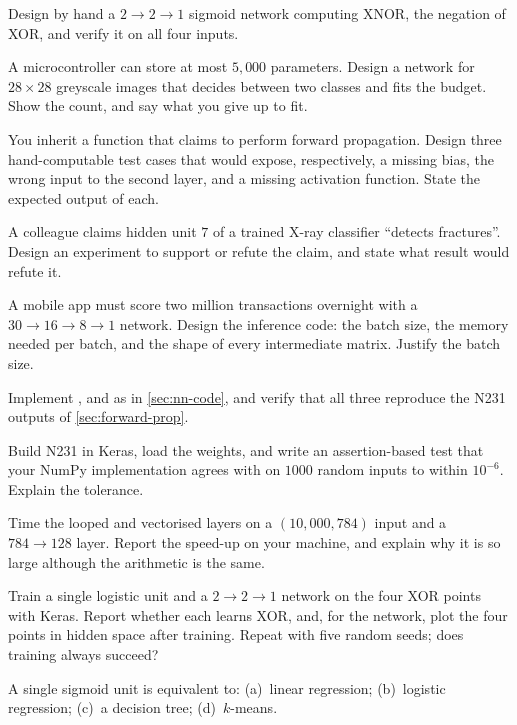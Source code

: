 \ap Design by hand a $2\to2\to1$ sigmoid network computing XNOR, the negation of
XOR, and verify it on all four inputs.


\dpr A microcontroller can store at most $5{,}000$ parameters. Design a network
for $28\times28$ greyscale images that decides between two classes and fits the
budget. Show the count, and say what you give up to fit.

\dpr You inherit a function that claims to perform forward propagation. Design
three hand-computable test cases that would expose, respectively, a missing bias,
the wrong input to the second layer, and a missing activation function. State
the expected output of each.

\dpr A colleague claims hidden unit $7$ of a trained X-ray classifier ``detects
fractures''. Design an experiment to support or refute the claim, and state
what result would refute it.

\dpr A mobile app must score two million transactions overnight with a
$30\to16\to8\to1$ network. Design the inference code: the batch size, the
memory needed per batch, and the shape of every intermediate matrix. Justify the
batch size.


\pe Implement ,  and  as in
\cref{sec:nn-code}, and verify that all three reproduce the N231 outputs of
\cref{sec:forward-prop}.

\pe Build N231 in Keras, load the weights, and write an assertion-based test
that your NumPy implementation agrees with  on $1000$ random
inputs to within $10^{-6}$. Explain the tolerance.

\pe Time the looped and vectorised layers on a $(10{,}000, 784)$ input and a
$784\to128$ layer. Report the speed-up on your machine, and explain why it is so
large although the arithmetic is the same.

\pe Train a single logistic unit and a $2\to2\to1$ network on the four XOR points
with Keras. Report whether each learns XOR, and, for the network, plot the four
points in hidden space after training. Repeat with five random seeds; does
training always succeed?


\qz A single sigmoid unit is equivalent to: (a)~linear regression; (b)~logistic
regression; (c)~a decision tree; (d)~$k$-means.


